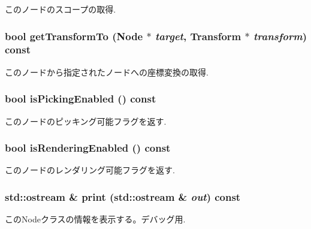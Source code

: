 このノードのスコープの取得. \hypertarget{classm3g_1_1Node_206a2e95eb7db42e6880414f77858113}{
\subsubsection[{getTransformTo}]{\setlength{\rightskip}{0pt plus 5cm}bool getTransformTo ({\bf Node} $\ast$ {\em target}, \/  {\bf Transform} $\ast$ {\em transform}) const}}
\label{classm3g_1_1Node_206a2e95eb7db42e6880414f77858113}


このノードから指定されたノードへの座標変換の取得. \hypertarget{classm3g_1_1Node_b3187e5056afa4a94af03e34125c86b1}{
\subsubsection[{isPickingEnabled}]{\setlength{\rightskip}{0pt plus 5cm}bool isPickingEnabled () const}}
\label{classm3g_1_1Node_b3187e5056afa4a94af03e34125c86b1}


このノードのピッキング可能フラグを返す. \hypertarget{classm3g_1_1Node_95020b155afed9552cc55377b09b1e86}{
\subsubsection[{isRenderingEnabled}]{\setlength{\rightskip}{0pt plus 5cm}bool isRenderingEnabled () const}}
\label{classm3g_1_1Node_95020b155afed9552cc55377b09b1e86}


このノードのレンダリング可能フラグを返す. \hypertarget{classm3g_1_1Node_6fea17fa1532df3794f8cb39cb4f911f}{
\subsubsection[{print}]{\setlength{\rightskip}{0pt plus 5cm}std::ostream \& print (std::ostream \& {\em out}) const}}
\label{classm3g_1_1Node_6fea17fa1532df3794f8cb39cb4f911f}


このNodeクラスの情報を表示する。デバッグ用. 


